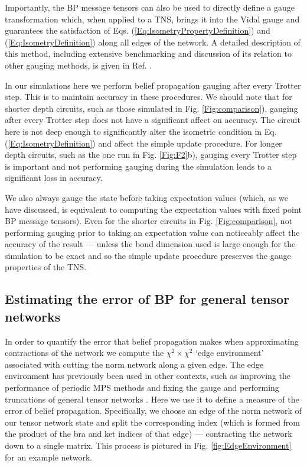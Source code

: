 \documentclass[%
 superscriptaddress,
 amsmath,amssymb,
 prx, nofootinbib,
 twocolumn
]{revtex4-2}
\begin{document}
Importantly, the BP message tensors can also be used to directly define a gauge transformation which, when applied to a TNS, brings it into the Vidal gauge and guarantees the satisfaction of Eqs. (\ref{Eq:IsometryPropertyDefinition}) and (\ref{Eq:IsometryDefinition}) along all edges of the network. 
A detailed description of this method, including extensive benchmarking and discussion of its relation to other gauging methods, is given in Ref. \cite{TindallGauging2023}. 

In our simulations here we perform belief propagation gauging after every Trotter step. This is to maintain accuracy in these procedures. We should note that for shorter depth circuits, such as those simulated in Fig. \ref{Fig:comparison}), gauging after every Trotter step does not have a significant affect on accuracy. The circuit here is not deep enough to significantly alter the isometric condition in Eq. (\ref{Eq:IsometryDefinition}) and affect the simple update procedure. For longer depth circuits, such as the one run in Fig. \ref{Fig:F2}b), gauging every Trotter step is important and not performing gauging during the simulation leads to a significant loss in accuracy. 

We also always gauge the state before taking expectation values (which, as we have discussed, is equivalent to computing the expectation values with fixed point BP message tensors). Even for the shorter circuits in Fig. \ref{Fig:comparison}, not performing gauging prior to taking an expectation value can noticeably affect the accuracy of the result --- unless the bond dimension used is large enough for the simulation to be exact and so the simple update procedure preserves the gauge properties of the TNS.

\subsection*{Estimating the error of BP for general tensor networks}
\label{Subsec:BPErrorEstimate}
In order to quantify the error that belief propagation makes when approximating contractions of the network we compute the $\chi^{2} \times \chi^{2}$ `edge environment' associated with cutting the norm network along a given edge. The edge environment has previously been used in other contexts, such as improving the performance of periodic MPS methods \cite{Pippan2010} and fixing the gauge and performing truncations of general tensor networks \cite{Evenbly2018}. Here we use it to define a measure of the error of belief propagation. Specifically, we choose an edge of the norm network of our tensor network state and split the corresponding index (which is formed from the product of the bra and ket indices of that edge) --- contracting the network down to a single matrix. This process is pictured in Fig. \ref{fig:EdgeEnvironment} for an example network.
\end{document}
